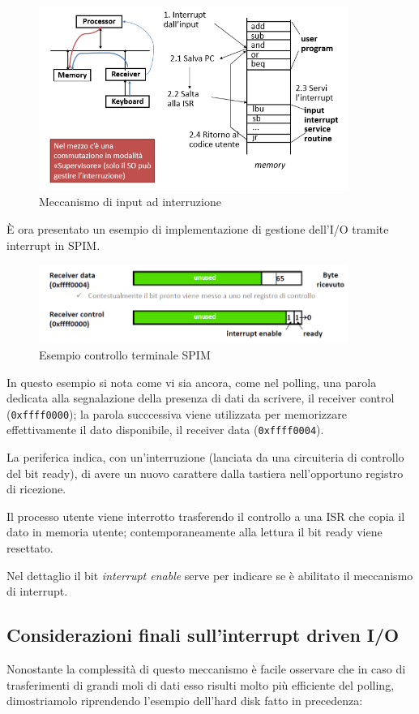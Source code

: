 \documentclass[class=book, crop=false, oneside]{standalone}
\begin{document}
\begin{figure}[!h]
	\centering
	\includegraphics[width=0.9\textwidth,keepaspectratio]{input-a-interruzione}
	\caption{Meccanismo di input ad interruzione}
\end{figure}
È ora presentato un esempio di implementazione di gestione dell'I/O tramite interrupt in SPIM.
\begin{figure}[!h]
	\centering
	\includegraphics[width=0.9\textwidth,keepaspectratio]{SPIM2}
	\caption{Esempio controllo terminale SPIM}
\end{figure}
In questo esempio si nota come vi sia ancora, come nel polling, una parola dedicata alla segnalazione della presenza di dati da scrivere, il receiver control (\texttt{0xffff0000}); la parola succcessiva viene utilizzata per memorizzare effettivamente il dato disponibile, il receiver data (\texttt{0xffff0004}).

La periferica indica, con un'interruzione (lanciata da una circuiteria di controllo del bit ready), di avere un nuovo carattere dalla tastiera nell'opportuno registro di ricezione.

Il processo utente viene interrotto trasferendo il controllo a una ISR che copia il dato in memoria utente; contemporaneamente alla lettura il bit ready viene resettato.

Nel dettaglio il bit \emph{interrupt enable} serve per indicare se è abilitato il meccanismo di interrupt.

\subsection{Considerazioni finali sull'interrupt driven I/O}
Nonostante la complessità di questo meccanismo è facile osservare che in caso di trasferimenti di grandi moli di dati esso risulti  molto più efficiente del polling, dimostriamolo riprendendo l'esempio dell'hard disk fatto in precedenza:
\end{document}
